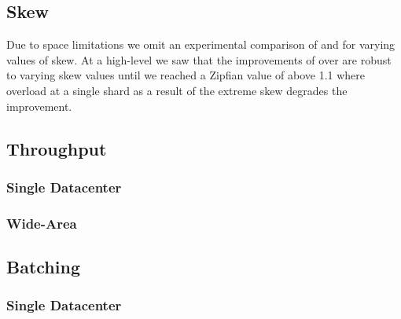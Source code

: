 


\subsection{Skew}
Due to space limitations we omit an experimental comparison of \sys{} and \mpaxos{} for varying values of skew. At a high-level we saw that the improvements of \sys{} over \mpaxos{} are robust to varying skew values until we reached a Zipfian value of above 1.1 where overload at a single shard as a result of the extreme skew degrades the improvement.


\subsection{Throughput}
\subsubsection{Single Datacenter}
\subsubsection{Wide-Area}

\subsection{Batching}
\subsubsection{Single Datacenter}





